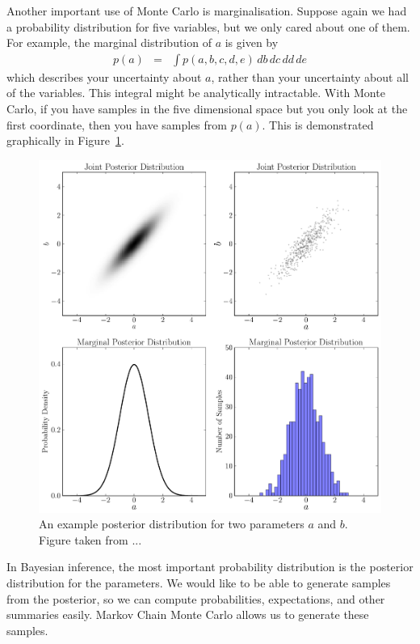 Another important use of Monte Carlo is marginalisation. Suppose again we had
a probability distribution for five variables, but we only cared about one of
them. For example, the marginal distribution of $a$ is given by
\begin{eqnarray}
p(a) &=& \int p(a, b, c, d, e) \, db \, dc \, dd \, de
\end{eqnarray}
which describes your uncertainty about $a$, rather than your uncertainty about
all of the variables. This integral might be analytically intractable. With
Monte Carlo, if you have samples in the five dimensional space but you only
look at the first coordinate, then you have samples from $p(a)$. This is
demonstrated graphically in Figure~\ref{fig:marginalisation}.

\begin{figure}
\begin{center}
\includegraphics[scale=0.5]{../marginalisation.pdf}
\caption{An example posterior distribution for two parameters $a$ and $b$.
Figure taken from ...
\label{fig:marginalisation}}
\end{center}
\end{figure}

In Bayesian inference, the most important probability distribution is the
posterior distribution for the parameters. We would like to be able to
generate samples from the posterior, so we can compute probabilities,
expectations, and other summaries easily. Markov Chain Monte Carlo allows us
to generate these samples.

